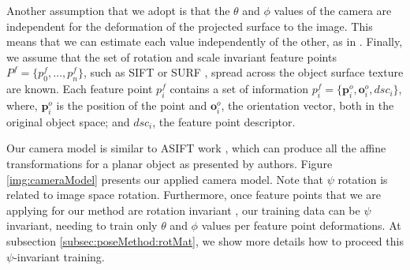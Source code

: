 \documentclass[annual]{acmsiggraph}
\begin{document}
Another assumption that we adopt is that the $\theta$ and $\phi$ values of the camera are independent for the deformation of the projected surface to the image. This means that we can estimate each value independently of the other, as in \cite{Fenzi:2013}. Finally, we assume that the set of rotation and scale invariant feature points $P^f = \{ p^f_0, \ldots, p^f_n \}$, such as SIFT \cite{Lowe:1999} or SURF \cite{Bay:2008}, spread across the object surface texture are known. Each feature point $p^f_i$ contains a set of information $p^f_i = \{ \mathbf{p}^o_i, \mathbf{o}^o_i, dsc_i \}$, where, $\mathbf{p}^o_i$ is the position of the point and $\mathbf{o}^o_i$, the orientation vector, both in the original object space; and $dsc_i$, the feature point descriptor. 


Our camera model is similar to ASIFT work \cite{Morel:2009}, which can produce all the affine transformations for a planar object as presented by authors. Figure \ref{img:cameraModel} presents our applied camera model. Note that $\psi$ rotation is related to image space rotation. Furthermore, once feature points that we are applying for our method are rotation invariant \cite{Bay:2008}, our training data can be $\psi$ invariant, needing to train only $\theta$ and $\phi$ values per feature point deformations. At subsection \ref{subsec:poseMethod:rotMat}, we show more details how to proceed this $\psi$-invariant training.   
\end{document}
